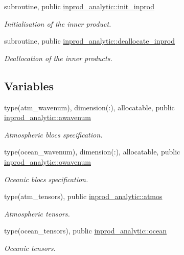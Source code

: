 \begin{DoxyCompactItemize}
subroutine, public \hyperlink{namespaceinprod__analytic_a7491dd2b8ba26eb10d160eb0bf072e56}{inprod\+\_\+analytic\+::init\+\_\+inprod}
\begin{DoxyCompactList}\small\item\em Initialisation of the inner product. \end{DoxyCompactList}\item 
subroutine, public \hyperlink{namespaceinprod__analytic_a77718deee55b484b0946e6c8faf72cd6}{inprod\+\_\+analytic\+::deallocate\+\_\+inprod}
\begin{DoxyCompactList}\small\item\em Deallocation of the inner products. \end{DoxyCompactList}\end{DoxyCompactItemize}
\subsection*{Variables}
\begin{DoxyCompactItemize}
\item 
type(atm\+\_\+wavenum), dimension(\+:), allocatable, public \hyperlink{namespaceinprod__analytic_aa6b6ebedac44495720ffe649bc937a56}{inprod\+\_\+analytic\+::awavenum}
\begin{DoxyCompactList}\small\item\em Atmospheric blocs specification. \end{DoxyCompactList}\item 
type(ocean\+\_\+wavenum), dimension(\+:), allocatable, public \hyperlink{namespaceinprod__analytic_a7273713c6b1a079e1c653e8b8d2fe089}{inprod\+\_\+analytic\+::owavenum}
\begin{DoxyCompactList}\small\item\em Oceanic blocs specification. \end{DoxyCompactList}\item 
type(atm\+\_\+tensors), public \hyperlink{namespaceinprod__analytic_a6f4fe9aa292d78b871e5498e411d1297}{inprod\+\_\+analytic\+::atmos}
\begin{DoxyCompactList}\small\item\em Atmospheric tensors. \end{DoxyCompactList}\item 
type(ocean\+\_\+tensors), public \hyperlink{namespaceinprod__analytic_ac691a1258fb0a341e2ba5b4811be1c0b}{inprod\+\_\+analytic\+::ocean}
\begin{DoxyCompactList}\small\item\em Oceanic tensors. \end{DoxyCompactList}\end{DoxyCompactItemize}
